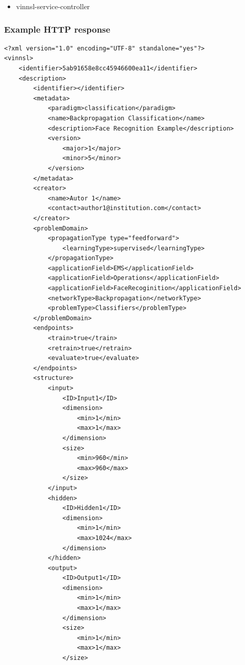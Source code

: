 \begin{itemize}
\tightlist
\item
  vinnsl-service-controller
\end{itemize}

\subsubsection{Example HTTP response}\label{example-http-response-2}

\begin{verbatim}
<?xml version="1.0" encoding="UTF-8" standalone="yes"?>
<vinnsl>
    <identifier>5ab91658e8cc45946600ea11</identifier>
    <description>
        <identifier></identifier>
        <metadata>
            <paradigm>classification</paradigm>
            <name>Backpropagation Classification</name>
            <description>Face Recognition Example</description>
            <version>
                <major>1</major>
                <minor>5</minor>
            </version>
        </metadata>
        <creator>
            <name>Autor 1</name>
            <contact>author1@institution.com</contact>
        </creator>
        <problemDomain>
            <propagationType type="feedforward">
                <learningType>supervised</learningType>
            </propagationType>
            <applicationField>EMS</applicationField>
            <applicationField>Operations</applicationField>
            <applicationField>FaceRecoginition</applicationField>
            <networkType>Backpropagation</networkType>
            <problemType>Classifiers</problemType>
        </problemDomain>
        <endpoints>
            <train>true</train>
            <retrain>true</retrain>
            <evaluate>true</evaluate>
        </endpoints>
        <structure>
            <input>
                <ID>Input1</ID>
                <dimension>
                    <min>1</min>
                    <max>1</max>
                </dimension>
                <size>
                    <min>960</min>
                    <max>960</max>
                </size>
            </input>
            <hidden>
                <ID>Hidden1</ID>
                <dimension>
                    <min>1</min>
                    <max>1024</max>
                </dimension>
            </hidden>
            <output>
                <ID>Output1</ID>
                <dimension>
                    <min>1</min>
                    <max>1</max>
                </dimension>
                <size>
                    <min>1</min>
                    <max>1</max>
                </size>

\end{verbatim}
